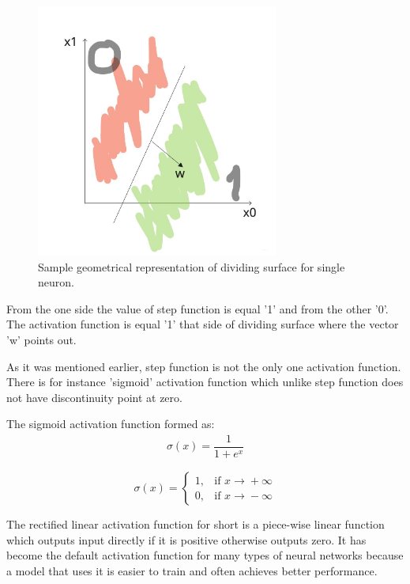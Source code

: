 \begin{figure}[h]
    \centering \includegraphics[width=8cm]{images/dividing_surface.jpg}
    \caption {Sample geometrical representation of dividing surface for single neuron.}
\end{figure}

From the one side the value of step function is equal '1' and from the other '0'. The activation function is equal '1' that side of dividing surface where the vector 'w' points out.

As it was mentioned earlier, step function is not the only one activation function. There is for instance 'sigmoid' activation function which unlike step function does not have discontinuity point at zero. 

The sigmoid activation function formed as:
\begin{align*}
\sigma(x) = \dfrac{1}{1+e^x}
\end{align*}

\[ \sigma(x) = \begin{cases} 1, & \mbox{if } x\mbox{$\xrightarrow{} + \infty$} \\ 0, & \mbox{if } x\mbox{$\xrightarrow{} - \infty$} \end{cases} \]

The rectified linear activation function for short is a piece-wise linear function which outputs input directly if it is positive otherwise outputs zero. It has become the default activation function for many types of neural networks because a model that uses it is easier to train and often achieves better performance.

